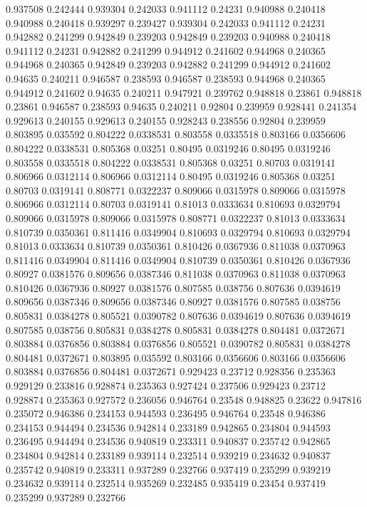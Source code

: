 0.937508 0.242444
0.939304 0.242033
0.941112 0.24231
0.940988 0.240418
0.940988 0.240418
0.939297 0.239427
0.939304 0.242033
0.941112 0.24231
0.942882 0.241299
0.942849 0.239203
0.942849 0.239203
0.940988 0.240418
0.941112 0.24231
0.942882 0.241299
0.944912 0.241602
0.944968 0.240365
0.944968 0.240365
0.942849 0.239203
0.942882 0.241299
0.944912 0.241602
0.94635 0.240211
0.946587 0.238593
0.946587 0.238593
0.944968 0.240365
0.944912 0.241602
0.94635 0.240211
0.947921 0.239762
0.948818 0.23861
0.948818 0.23861
0.946587 0.238593
0.94635 0.240211
0.92804 0.239959
0.928441 0.241354
0.929613 0.240155
0.929613 0.240155
0.928243 0.238556
0.92804 0.239959
0.803895 0.035592
0.804222 0.0338531
0.803558 0.0335518
0.803166 0.0356606
0.804222 0.0338531
0.805368 0.03251
0.80495 0.0319246
0.80495 0.0319246
0.803558 0.0335518
0.804222 0.0338531
0.805368 0.03251
0.80703 0.0319141
0.806966 0.0312114
0.806966 0.0312114
0.80495 0.0319246
0.805368 0.03251
0.80703 0.0319141
0.808771 0.0322237
0.809066 0.0315978
0.809066 0.0315978
0.806966 0.0312114
0.80703 0.0319141
0.81013 0.0333634
0.810693 0.0329794
0.809066 0.0315978
0.809066 0.0315978
0.808771 0.0322237
0.81013 0.0333634
0.810739 0.0350361
0.811416 0.0349904
0.810693 0.0329794
0.810693 0.0329794
0.81013 0.0333634
0.810739 0.0350361
0.810426 0.0367936
0.811038 0.0370963
0.811416 0.0349904
0.811416 0.0349904
0.810739 0.0350361
0.810426 0.0367936
0.80927 0.0381576
0.809656 0.0387346
0.811038 0.0370963
0.811038 0.0370963
0.810426 0.0367936
0.80927 0.0381576
0.807585 0.038756
0.807636 0.0394619
0.809656 0.0387346
0.809656 0.0387346
0.80927 0.0381576
0.807585 0.038756
0.805831 0.0384278
0.805521 0.0390782
0.807636 0.0394619
0.807636 0.0394619
0.807585 0.038756
0.805831 0.0384278
0.805831 0.0384278
0.804481 0.0372671
0.803884 0.0376856
0.803884 0.0376856
0.805521 0.0390782
0.805831 0.0384278
0.804481 0.0372671
0.803895 0.035592
0.803166 0.0356606
0.803166 0.0356606
0.803884 0.0376856
0.804481 0.0372671
0.929423 0.23712
0.928356 0.235363
0.929129 0.233816
0.928874 0.235363
0.927424 0.237506
0.929423 0.23712
0.928874 0.235363
0.927572 0.236056
0.946764 0.23548
0.948825 0.23622
0.947816 0.235072
0.946386 0.234153
0.944593 0.236495
0.946764 0.23548
0.946386 0.234153
0.944494 0.234536
0.942814 0.233189
0.942865 0.234804
0.944593 0.236495
0.944494 0.234536
0.940819 0.233311
0.940837 0.235742
0.942865 0.234804
0.942814 0.233189
0.939114 0.232514
0.939219 0.234632
0.940837 0.235742
0.940819 0.233311
0.937289 0.232766
0.937419 0.235299
0.939219 0.234632
0.939114 0.232514
0.935269 0.232485
0.935419 0.23454
0.937419 0.235299
0.937289 0.232766
